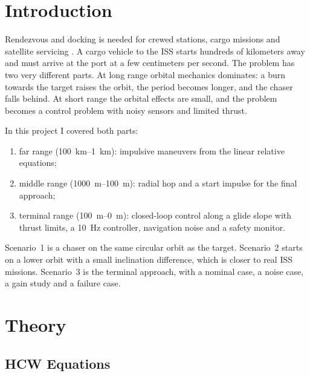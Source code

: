 \documentclass[letterpaper,10pt]{article}
\begin{document}
\section{Introduction}

Rendezvous and docking is needed for crewed stations, cargo missions and
satellite servicing \cite{fehse}. A cargo vehicle to the ISS starts hundreds
of kilometers away and must arrive at the port at a few centimeters per
second. The problem has two very different parts. At long range orbital
mechanics dominates: a burn towards the target raises the orbit, the period
becomes longer, and the chaser falls behind. At short range the orbital
effects are small, and the problem becomes a control problem with noisy
sensors and limited thrust.

In this project I covered both parts:
\begin{enumerate}[leftmargin=2.2em,itemsep=0pt]
  \item far range (\SIrange{100}{1}{km}): impulsive maneuvers from the linear
        relative equations;
  \item middle range (\SIrange{1000}{100}{m}): radial hop and a start
        impulse for the final approach;
  \item terminal range (\SIrange{100}{0}{m}): closed-loop control along a
        glide slope with thrust limits, a \SI{10}{Hz} controller, navigation
        noise and a safety monitor.
\end{enumerate}
Scenario~1 is a chaser on the same circular orbit as the target. Scenario~2
starts on a lower orbit with a small inclination difference, which is closer
to real ISS missions. Scenario~3 is the terminal approach, with a nominal
case, a noise case, a gain study and a failure case.

\section{Theory}

\subsection{HCW Equations}
\end{document}
